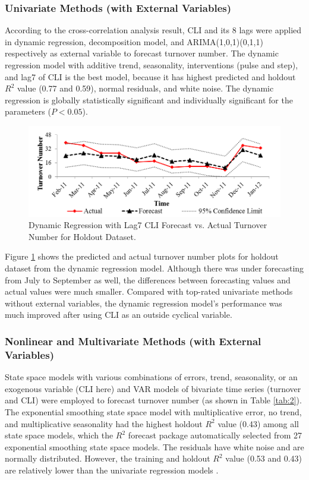 \subsubsection{Univariate Methods (with External Variables)}
According to the cross-correlation analysis result, CLI and its 8 lags were applied in dynamic regression, decomposition model, and ARIMA(1,0,1)(0,1,1) respectively as external variable to forecast turnover number. The dynamic regression model with additive trend, seasonality, interventions (pulse and step), and lag7 of CLI is the best model, because it has highest predicted and holdout $R^2$ value (0.77 and 0.59), normal residuals, and white noise. The dynamic regression is globally statistically significant and individually significant for the parameters ($P<0.05$).
\begin{figure}
	\centering
	\includegraphics[width=5.5in]{Fig6.png}
	\caption{Dynamic Regression with Lag7 CLI Forecast vs. Actual Turnover Number for Holdout Dataset.}
	\label{fig:6}
\end{figure}
Figure \ref{fig:6} shows the predicted and actual turnover number plots for holdout dataset from the dynamic regression model. Although there was under forecasting from July to September as well, the differences between forecasting values and actual values were much smaller. Compared with top-rated univariate methods without external variables, the dynamic regression model's performance was much improved after using CLI as an outside cyclical variable. 

\subsubsection{Nonlinear and Multivariate Methods (with External Variables)}
State space models with various combinations of errors, trend, seasonality, or an exogenous variable (CLI here) and VAR models of bivariate time series (turnover and CLI) were employed to forecast turnover number (as shown in Table \ref{tab:2}). The exponential smoothing state space model with multiplicative error, no trend, and multiplicative seasonality had the highest holdout $R^2$ value (0.43) among all state space models, which the $R^2$ forecast package automatically selected from 27 exponential smoothing state space models. The residuals have white noise and are normally distributed. However, the training and holdout $R^2$ value (0.53 and 0.43) are relatively lower than the univariate regression models . 
 
